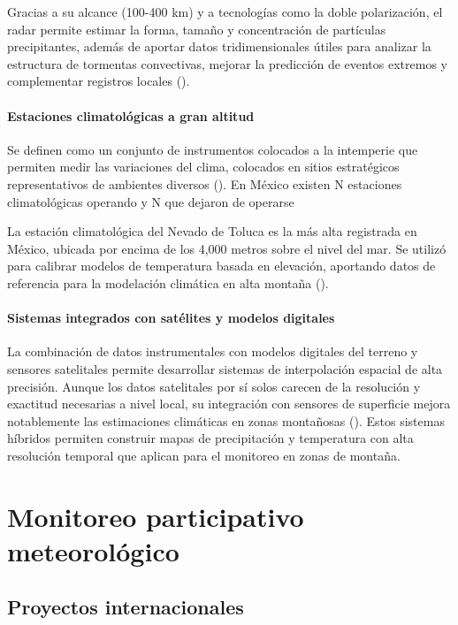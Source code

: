 Gracias a su alcance (100-400 km) y a tecnologías como la doble polarización, el radar permite estimar la forma, tamaño y concentración de partículas precipitantes, además de aportar datos tridimensionales útiles para analizar la estructura de tormentas convectivas, mejorar la predicción de eventos extremos y complementar registros locales (\cite{GarciaPalomo2008}). 



\paragraph{Estaciones climatológicas a gran altitud}
Se definen como un conjunto de instrumentos colocados a la intemperie que permiten medir las variaciones del clima, colocados en sitios estratégicos representativos de ambientes diversos (\cite{conagua_estaciones_climatologicas_2013}).
En México existen N estaciones climatológicas operando y N que dejaron de operarse

La estación climatológica del Nevado de Toluca es la más alta registrada en México, ubicada por encima de los 4,000 metros sobre el nivel del mar. Se utilizó para calibrar modelos de temperatura basada en elevación, aportando datos de referencia para la modelación climática en alta montaña  (\cite{soto_delgado_2020}).

\paragraph{Sistemas integrados con satélites y modelos digitales}

La combinación de datos instrumentales con modelos digitales del terreno y sensores satelitales permite desarrollar sistemas de interpolación espacial de alta precisión. Aunque los datos satelitales por sí solos carecen de la resolución y exactitud necesarias a nivel local, su integración con sensores de superficie mejora notablemente las estimaciones climáticas en zonas montañosas  (\cite{lei2022combining}). Estos sistemas híbridos permiten construir mapas de precipitación y temperatura con alta resolución temporal que aplican para el monitoreo en zonas de montaña.



\section{Monitoreo participativo meteorológico}

\subsection{Proyectos internacionales}

